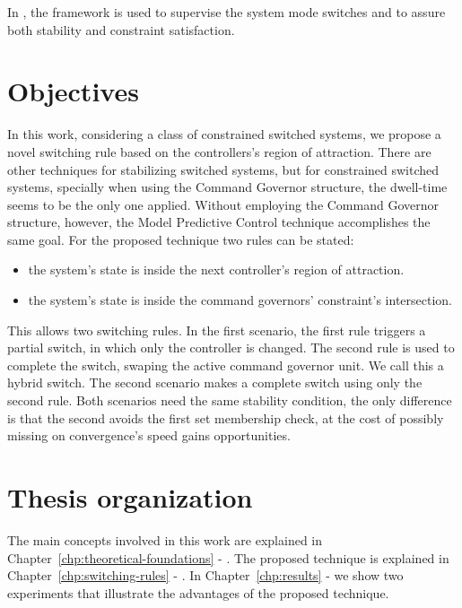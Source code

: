 In \parencite{franzè.lucia.ea:command,lucia.franzè:stabilization}, the \CG{}
framework is used to supervise the system mode switches and to assure both
stability and constraint satisfaction.

\section{Objectives}%
\label{sec:objectives}

In this work, considering a class of constrained switched systems, we propose a
novel switching rule based on the controllers's region of attraction. There are
other techniques for stabilizing switched systems, but for constrained switched
systems, specially when using the Command Governor structure, the dwell-time
seems to be the only one applied. Without employing the Command Governor
structure, however, the Model Predictive Control technique accomplishes the same
goal. For the proposed technique two rules can be stated:

\begin{itemize}
  \item the system's state is inside the next controller's region of attraction.
  \item the system's state is inside the command governors' constraint's
        intersection.
\end{itemize}

This allows two switching rules. In the first scenario, the first rule triggers
a partial switch, in which only the controller is changed. The second rule is
used to complete the switch, swaping the active command governor unit. We call
this a hybrid switch. The second scenario makes a complete switch using only the
second rule. Both scenarios need the same stability condition, the only
difference is that the second avoids the first set membership check, at the cost
of possibly missing on convergence's speed gains opportunities.

\section{Thesis organization}%
\label{sec:organization}

The main concepts involved in this work are explained in
Chapter~\ref{chp:theoretical-foundations} -
. The proposed technique is explained in
Chapter~\ref{chp:switching-rules} - . In
Chapter~\ref{chp:results} -  we show two experiments that
illustrate the advantages of the proposed technique.

